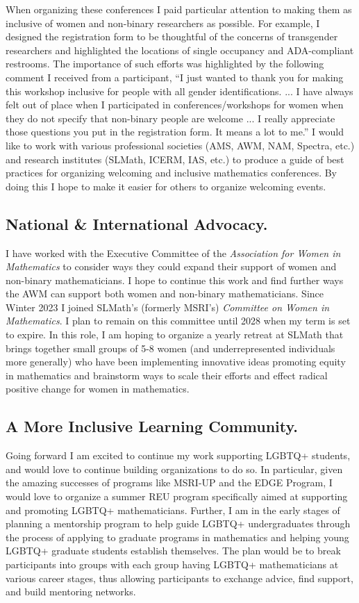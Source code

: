 \documentclass[11pt,reqno]{amsart}
\theoremstyle{remark}
\begin{document}
When organizing these conferences I paid particular attention to making them as inclusive of women and non-binary researchers as possible. For example, I designed the registration form to be thoughtful of the concerns of transgender researchers and highlighted the locations of single occupancy and ADA-compliant restrooms. The importance of such efforts was highlighted by the following comment I received from a participant, ``I just wanted to thank you for making this workshop inclusive for people with all gender identifications. ... I have always felt out of place when I participated in conferences/workshops for women when they do not specify that non-binary people are welcome ... I really appreciate those questions you put in the registration form. It means a lot to me.'' I would like to work with various professional societies (AMS, AWM, NAM, Spectra, etc.) and research institutes (SLMath, ICERM, IAS, etc.) to produce a guide of best practices for organizing welcoming and inclusive mathematics conferences. By doing this I hope to make it easier for others to organize welcoming events. 

\subsection{ National \& International Advocacy.} I have worked with the Executive Committee of the \textit{Association for Women in Mathematics} to consider ways they could expand their support of women and non-binary mathematicians. I hope to continue this work and find further ways the AWM can support both women and non-binary mathematicians. Since Winter 2023 I joined SLMath's (formerly MSRI's)  \textit{Committee on Women in Mathematics}. I plan to remain on this committee until 2028 when my term is set to expire. In this role, I am hoping to organize a yearly retreat at SLMath that brings together small groups of 5-8 women (and underrepresented individuals more generally) who have been implementing innovative ideas promoting equity in mathematics and brainstorm ways to scale their efforts and effect radical positive change for women in mathematics.  


\subsection{A More Inclusive Learning Community.}  Going forward I am excited to continue my work supporting LGBTQ+ students, and would love to continue building organizations to do so. In particular, given the amazing successes of programs like MSRI-UP and the EDGE Program, I would love to organize a summer REU program specifically aimed at supporting and promoting LGBTQ+ mathematicians. Further, I am in the early stages of planning a mentorship program to help guide LGBTQ+ undergraduates through the process of applying to graduate programs in mathematics and helping young LGBTQ+ graduate students establish themselves. The plan would be to break participants into groups with each group having LGBTQ+ mathematicians at various career stages, thus allowing participants to exchange advice, find support, and build mentoring networks.
\end{document}
